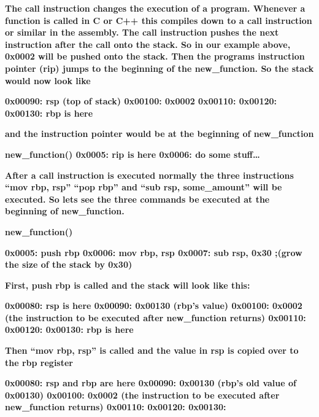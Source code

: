 \documentclass[letterpaper]{article}
\begin{document}
\textbf{The call instruction changes the execution of a program. Whenever a function is called in C or C++ this compiles
down to a call instruction or similar in the assembly. The call instruction pushes the next instruction after the call
onto the stack. So in our example above, 0x0002 will be pushed onto the stack. Then the programs instruction pointer
(rip) jumps to the beginning of the new\_function. So the stack would now look like}

\textbf{0x00090: rsp (top of stack)\newline
0x00100: 0x0002\newline
0x00110:\newline
0x00120:\newline
0x00130: rbp is here}

\textbf{and the instruction pointer would be at the beginning of new\_function}

\textbf{new\_function()\newline
0x0005: rip is here\newline
0x0006: do some stuff{\dots}}

\textbf{After a call instruction is executed normally the three instructions ``mov rbp, rsp'' ``pop rbp'' and ``sub rsp,
some\_amount'' will be executed. So lets see the three commands be executed at the beginning of new\_function.}

\textbf{new\_function()}

\textbf{0x0005: push rbp\newline
0x0006: mov rbp, rsp\newline
0x0007: sub rsp, 0x30 ;(grow the size of the stack by 0x30)}

\textbf{First, push rbp is called and the stack will look like this:}

\textbf{0x00080: rsp is here\newline
0x00090: 0x00130 (rbp's value)\newline
0x00100: 0x0002 (the instruction to be executed after new\_function returns)\newline
0x00110:\newline
0x00120:\newline
0x00130: rbp is here}

\textbf{Then ``mov rbp, rsp'' is called and the value in rsp is copied over to the rbp register}

\textbf{0x00080: rsp and rbp are here\newline
0x00090: 0x00130 (rbp's old value of 0x00130)\newline
0x00100: 0x0002 (the instruction to be executed after new\_function returns)\newline
0x00110:\newline
0x00120:\newline
0x00130:}
\end{document}
